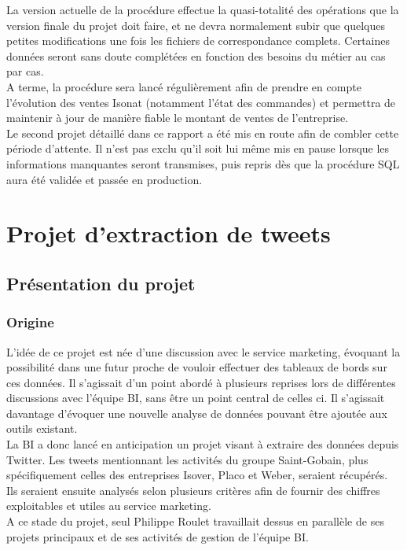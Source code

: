 \documentclass[a4paper,12pt]{article}
\begin{document}
La version actuelle de la procédure effectue la quasi-totalité des opérations que la version finale du projet doit faire, et ne devra normalement subir que quelques petites modifications une fois les fichiers de correspondance complets. Certaines données seront sans doute complétées en fonction des besoins du métier au cas par cas.\\

A terme, la procédure sera lancé régulièrement afin de prendre en compte l'évolution des ventes Isonat (notamment l'état des commandes) et permettra de maintenir à jour de manière fiable le montant de ventes de l'entreprise. \\

Le second projet détaillé dans ce rapport a été mis en route afin de combler cette période d'attente. Il n'est pas exclu qu'il soit lui même mis en pause lorsque les informations manquantes seront transmises, puis repris dès que la procédure SQL aura été validée et passée en production.




\section{Projet d'extraction de tweets}
\subsection{Présentation du projet}
\subsubsection{Origine}
L'idée de ce projet est née d'une discussion avec le service marketing, évoquant la possibilité dans une futur proche de vouloir effectuer des tableaux de bords sur ces données. Il s'agissait d'un point abordé à plusieurs reprises lors de différentes discussions avec l'équipe BI, sans être un point central de celles ci. Il s'agissait davantage d'évoquer une nouvelle analyse de données pouvant être ajoutée aux outils existant.\\

La BI a donc lancé en anticipation un projet visant à extraire des données depuis Twitter. Les tweets mentionnant les activités du groupe Saint-Gobain, plus spécifiquement celles des entreprises Isover, Placo et Weber, seraient récupérés. Ils seraient ensuite analysés selon plusieurs critères afin de fournir des chiffres exploitables et utiles au service marketing. \\
A ce stade du projet, seul Philippe Roulet travaillait dessus en parallèle de ses projets principaux et de ses activités de gestion de l'équipe BI.
\end{document}
